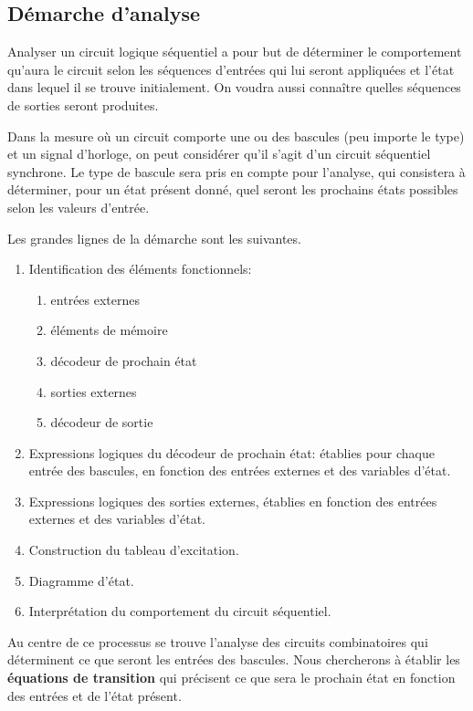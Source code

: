 \documentclass[11pt]{article}
\begin{document}
\subsection{Démarche d'analyse}
\label{sec:orga171334}

Analyser un circuit logique séquentiel a pour but de déterminer le
comportement qu'aura le circuit selon les séquences d'entrées qui lui
seront appliquées et l'état dans lequel il se trouve initialement. On
voudra aussi connaître quelles séquences de sorties seront produites.

Dans la mesure où un circuit comporte une ou des bascules (peu importe
le type) et un signal d'horloge, on peut considérer qu'il s'agit d'un
circuit séquentiel synchrone. Le type de bascule sera pris en compte
pour l'analyse, qui consistera à déterminer, pour un état présent
donné, quel seront les prochains états possibles selon les valeurs
d'entrée.

Les grandes lignes de la démarche sont les suivantes.

\begin{enumerate}
\item Identification des éléments fonctionnels:

\begin{enumerate}
\item entrées externes

\item éléments de mémoire

\item décodeur de prochain état

\item sorties externes

\item décodeur de sortie
\end{enumerate}
\item Expressions logiques du décodeur de prochain état: établies pour
chaque entrée des bascules, en fonction des entrées externes et des
variables d'état.
\item Expressions logiques des sorties externes, établies en fonction des
entrées externes et des variables d'état.
\item Construction du tableau d'excitation.
\item Diagramme d'état.
\item Interprétation du comportement du circuit séquentiel.
\end{enumerate}

Au centre de ce processus se trouve l'analyse des circuits
combinatoires qui déterminent ce que seront les entrées des
bascules. Nous chercherons à établir les \textbf{équations de transition} qui
précisent ce que sera le prochain état en fonction des entrées et de
l'état présent.
\end{document}
